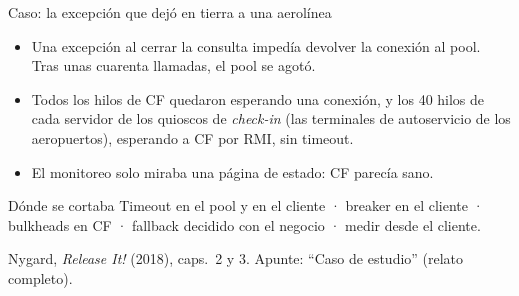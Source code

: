 \documentclass[institutional,screen,none]{ua-engineering-v6-beamer}
\begin{document}
\begin{frame}{Caso: la excepción que dejó en tierra a una aerolínea}
\begin{center}
\end{center}

\begin{itemize}\footnotesize
\item Una excepción al cerrar la consulta impedía devolver la conexión al pool. Tras unas cuarenta llamadas, el pool se agotó.
\item Todos los hilos de CF quedaron esperando una conexión, y los 40 hilos de cada servidor de los quioscos de \emph{check-in} (las terminales de autoservicio de los aeropuertos), esperando a CF por RMI, sin timeout.
\item El monitoreo solo miraba una página de estado: CF parecía sano.
\end{itemize}

\begin{block}{Dónde se cortaba}
Timeout en el pool y en el cliente · breaker en el cliente · bulkheads en CF · fallback decidido con el negocio · medir desde el cliente.
\end{block}

{\scriptsize\color{UAIngMuted}Nygard, \emph{Release It!} (2018), caps.~2 y 3. Apunte: ``Caso de estudio'' (relato completo).}
\end{frame}

\end{document}
